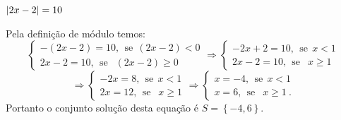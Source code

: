 \begin{exem}
 $\left|2x-2\right|= 10$

  Pela definição de módulo temos:
  \[
  \begin{cases}
      -(2x-2)= 10, \ \ \text{se} \ \ (2x-2)<0 \\
      2x-2= 10, \ \ \text{se } \ \ (2x-2) \geq 0
     \end{cases}
     \Rightarrow
     \begin{cases}
      -2x + 2= 10, \ \ \text{se} \ \ x< 1 \\
      2x - 2= 10, \ \ \text{se } \ \ x \geq 1
     \end{cases}
     \]
     \[
     \Rightarrow
     \begin{cases}
      -2x= 8, \ \ \text{se} \ \ x< 1 \\
       2x= 12, \ \ \text{se } \ \ x \geq 1
     \end{cases}
     \Rightarrow
     \begin{cases}
      x= -4, \ \ \text{se} \ \ x< 1 \\
      x= 6, \ \ \text{se } \ \ x \geq 1 \ .
     \end{cases}
  \]
  Portanto o conjunto solução desta equação é $S= \left\{-4, 6 \right\}$.
 \end{exem}
 
